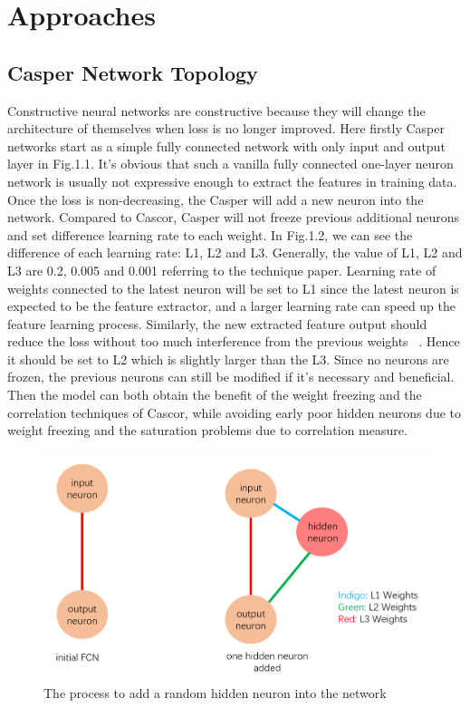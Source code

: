 \section{Approaches}
\subsection{Casper Network Topology}
Constructive neural networks are constructive because they will change the architecture of themselves when loss is no longer improved. Here firstly Casper networks start as a simple fully connected network with only input and output layer in Fig.1.1. It’s obvious that such a vanilla fully connected one-layer neuron network is usually not expressive enough to extract the features in training data. Once the loss is non-decreasing, the Casper will add a new neuron into the network. Compared to Cascor, Casper will not freeze previous additional neurons and set difference learning rate to each weight. In Fig.1.2, we can see the difference of each learning rate: L1, L2 and L3. Generally, the value of L1, L2 and L3 are 0.2, 0.005 and 0.001 referring to the technique paper. Learning rate of weights connected to the latest neuron will be set to L1 since the latest neuron is expected to be the feature extractor, and a larger learning rate can speed up the feature learning process. Similarly, the new extracted feature output should reduce the loss without too much interference from the previous weights ~\cite{CascadeCorrelation1990}. Hence it should be set to L2 which is slightly larger than the L3. Since no neurons are frozen, the previous neurons can still be modified if it’s necessary and beneficial. Then the model can both obtain the benefit of the weight freezing and the correlation techniques of Cascor, while avoiding early poor hidden neurons due to weight freezing and the saturation problems due to correlation measure. ~\cite{vae2020}\\

\begin{figure}[hbt!]
\centering
\includegraphics[width=\textwidth]{images/reimg1.png}
\caption{The process to add a random hidden neuron into the network}
\label{figure1}  
\end{figure}

